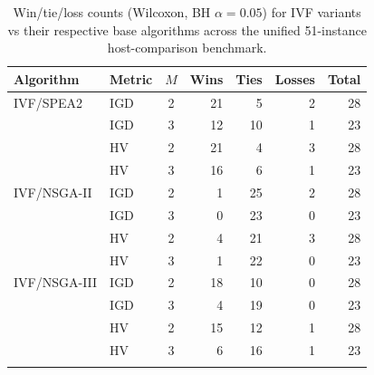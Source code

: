 \begin{table}[t]
\centering
\caption{Win/tie/loss counts (Wilcoxon, BH $\alpha=0.05$) for IVF variants vs their respective base algorithms across the unified 51-instance host-comparison benchmark.}
\label{tab:hosts_summary}
\begin{tabular}{llcrrrr}
\toprule
Algorithm & Metric & $M$ & Wins & Ties & Losses & Total \\
\midrule
IVF/SPEA2 & IGD & 2 & 21 & 5 & 2 & 28 \\
 & IGD & 3 & 12 & 10 & 1 & 23 \\
 & HV & 2 & 21 & 4 & 3 & 28 \\
 & HV & 3 & 16 & 6 & 1 & 23 \\
\addlinespace
IVF/NSGA-II & IGD & 2 & 1 & 25 & 2 & 28 \\
 & IGD & 3 & 0 & 23 & 0 & 23 \\
 & HV & 2 & 4 & 21 & 3 & 28 \\
 & HV & 3 & 1 & 22 & 0 & 23 \\
\addlinespace
IVF/NSGA-III & IGD & 2 & 18 & 10 & 0 & 28 \\
 & IGD & 3 & 4 & 19 & 0 & 23 \\
 & HV & 2 & 15 & 12 & 1 & 28 \\
 & HV & 3 & 6 & 16 & 1 & 23 \\
\addlinespace
\bottomrule
\end{tabular}
\end{table}
